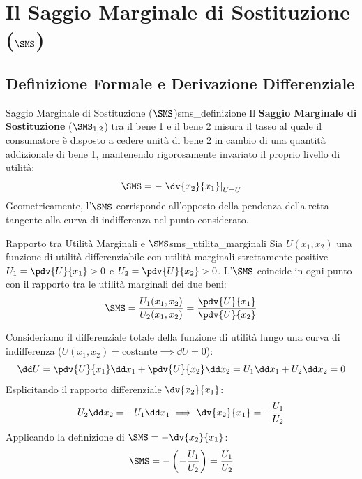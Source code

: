 \section{Il Saggio Marginale di Sostituzione ($\SMS$)}

\subsection{Definizione Formale e Derivazione Differenziale}

\begin{definizione}{Saggio Marginale di Sostituzione ($\SMS$)}{sms_definizione}
Il \textbf{Saggio Marginale di Sostituzione} ($\SMS_{1,2}$) tra il bene 1 e il bene 2 misura il tasso al quale il consumatore è disposto a cedere unità di bene 2 in cambio di una quantità addizionale di bene 1, mantenendo rigorosamente invariato il proprio livello di utilità:
\begin{equation}
    \SMS = - \left. \dv{x_2}{x_1} \right|_{U = \bar{U}}
\end{equation}
Geometricamente, l'$\SMS$ corrisponde all'opposto della pendenza della retta tangente alla curva di indifferenza nel punto considerato.
\end{definizione}

\begin{teorema}{Rapporto tra Utilità Marginali e $\SMS$}{sms_utilita_marginali}
Sia $U(x_1, x_2)$ una funzione di utilità differenziabile con utilità marginali strettamente positive $U_1 = \pdv{U}{x_1} > 0$ e $U_2 = \pdv{U}{x_2} > 0$.
L'$\SMS$ coincide in ogni punto con il rapporto tra le utilità marginali dei due beni:
\begin{equation}
    \SMS = \frac{U_1(x_1, x_2)}{U_2(x_1, x_2)} = \frac{\pdv{U}{x_1}}{\pdv{U}{x_2}}
\end{equation}
\end{teorema}

\begin{dimostrazione}
Consideriamo il differenziale totale della funzione di utilità lungo una curva di indifferenza ($U(x_1, x_2) = \text{costante} \implies \dd U = 0$):
\begin{equation}
    \dd U = \pdv{U}{x_1} \dd x_1 + \pdv{U}{x_2} \dd x_2 = U_1 \dd x_1 + U_2 \dd x_2 = 0
\end{equation}
Esplicitando il rapporto differenziale $\dv{x_2}{x_1}$:
\begin{equation}
    U_2 \dd x_2 = - U_1 \dd x_1 \implies \dv{x_2}{x_1} = - \frac{U_1}{U_2}
\end{equation}
Applicando la definizione di $\SMS = - \dv{x_2}{x_1}$:
\begin{equation}
    \SMS = - \left( - \frac{U_1}{U_2} \right) = \frac{U_1}{U_2}
\end{equation}
\end{dimostrazione}

